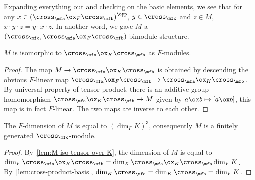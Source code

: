 \begin{construction}[$M$]
Expanding everything out and checking on the basic elements, we see that for any $x \in \left(\cross_{\mfa}\ox_{F}\cross_{\mfb}\right)^{\opp}$, $y \in \cross_{\mfc}$ and $z \in M$, $x \cdot y \cdot z = y \cdot x \cdot z$. In another word, we gave $M$ a $\left(\cross_{\mfc}, \cross_{\mfa} \ox_{F} \cross_{\mfb}\right)$-bimodule structure.
  \leanok
\end{construction}


\begin{lemma}\label{lem:M-iso-tensor-over-K}
  $M$ is isomorphic to $\cross_{\mfa}\ox_{K}\cross_{\mfb}$ as $F$-modules.
  \leanok
\end{lemma}
\begin{proof}
  The map $M \to \cross_{\mfa}\ox_{K}\cross_{\mfb}$ is obtained by descending the obvious $F$-linear map $\cross_{\mfa}\ox_{F}\cross_{\mfb}\to\cross_{\mfa}\ox_{K}\cross_{\mfb}$.
  By universal property of tensor product, there is an additive group homomorphism $\cross_{\mfa}\ox_{K}\cross_{\mfb} \to M$ given by $a \ox b \mapsto [a\ox b]$, this map is in fact $F$-linear. The two maps are inverse to each other.
\end{proof}

\begin{corollary}\label{cor:dim-finite-M}
  The $F$-dimension of $M$ is equal to ${\left(\dim_{F}K\right)}^{3}$, consequently $M$ is a finitely generated $\cross_{\mfc}$-module.
  \leanok
\end{corollary}
\begin{proof}
  By~\cref{lem:M-iso-tensor-over-K}, the dimension of $M$ is equal to $\dim_{F}\cross_{\mfa}\ox_{K}\cross_{\mfb} = \dim_{K}\cross_{\mfa}\ox_{K}\cross_{\mfb}\dim_{F}K$. By~\cref{lem:cross-product-basis}, $\dim_{K}\cross_{\mfa} = \dim_{K}\cross_{\mfb} = \dim_{F}K$.
\end{proof}

